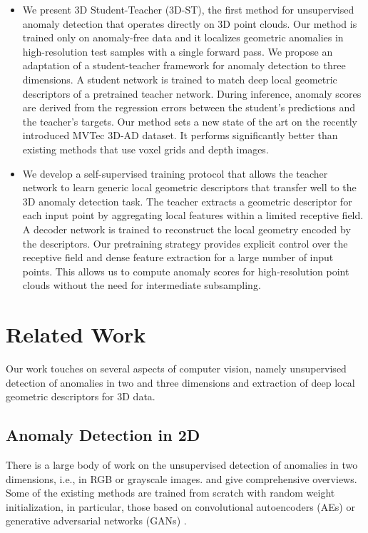 \documentclass[twoside,11pt]{article}
\newcommand{\methodname}{{3D-ST}}
\begin{document}
\begin{itemize}
    \setlength\itemsep{1ex}
    \item[] We present 3D Student-Teacher (\methodname{}), the first method for unsupervised anomaly detection that operates directly on 3D point clouds. Our method is trained only on anomaly-free data and it localizes geometric anomalies in high-resolution test samples with a single forward pass. We propose an adaptation of a student-teacher framework for anomaly detection to three dimensions. A student network is trained to match deep local geometric descriptors of a pretrained teacher network. During inference, anomaly scores are derived from the regression errors between the student's predictions and the teacher's targets. Our method sets a new state of the art on the recently introduced MVTec 3D-AD dataset. It performs significantly better than existing methods that use voxel grids and depth images.
    
    \item[] We develop a self-supervised training protocol that allows the teacher network to learn generic local geometric descriptors that transfer well to the 3D anomaly detection task. The teacher extracts a geometric descriptor for each input point by aggregating local features within a limited receptive field. A decoder network is trained to reconstruct the local geometry encoded by the descriptors. Our pretraining strategy provides explicit control over the receptive field and dense feature extraction for a large number of input points. This allows us to compute anomaly scores for high-resolution point clouds without the need for intermediate subsampling.
\end{itemize}

\section{Related Work}

Our work touches on several aspects of computer vision, namely unsupervised detection of anomalies in two and three dimensions and extraction of deep local geometric descriptors for 3D data. 

\subsection{Anomaly Detection in 2D}

There is a large body of work on the unsupervised detection of anomalies in two dimensions, i.e., in RGB or grayscale images. \citet{ehret_review_paper_2019} and \citet{pang2021adreview} give comprehensive overviews. Some of the existing methods are trained from scratch with random weight initialization, in particular, those based on convolutional autoencoders (AEs)
\citep{Bergmann_2019_SSIM_AE,Hong_2020_DecentralizationLoss,Liu_2020_VisuallyExplaining,Venkataramanan_2020_AttentionGuided,Wang_2020_LatentSpaceResampling} or generative adversarial networks (GANs) \citep{Carrara_2021_CBiGAN,Potter_2020_pandanet,Schlegl_2019_fAnoGan}. 
\end{document}
